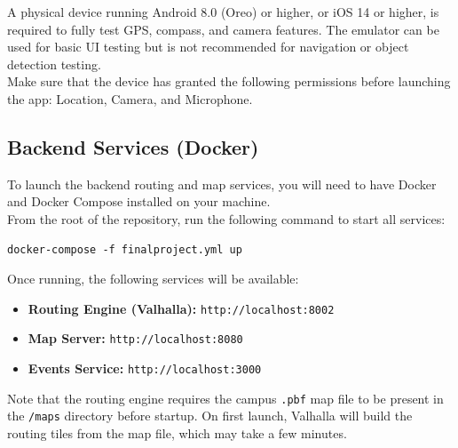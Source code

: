 \documentclass[12pt]{article}
\begin{document}
\noindent A physical device running Android 8.0 (Oreo) or higher, or iOS 14 or higher, is required to fully test GPS, compass, and camera features. The emulator can be used for basic UI testing but is not recommended for navigation or object detection testing. \\

\noindent Make sure that the device has granted the following permissions before launching the app: Location, Camera, and Microphone.

\subsection*{Backend Services (Docker)}

To launch the backend routing and map services, you will need to have Docker and Docker Compose installed on your machine. \\

\noindent From the root of the repository, run the following command to start all services:
\begin{verbatim}
docker-compose -f finalproject.yml up
\end{verbatim}

\noindent Once running, the following services will be available:

\begin{itemize}
    \item \textbf{Routing Engine (Valhalla):} \texttt{http://localhost:8002}
    \item \textbf{Map Server:} \texttt{http://localhost:8080}
    \item \textbf{Events Service:} \texttt{http://localhost:3000}
\end{itemize}

\noindent Note that the routing engine requires the campus \texttt{.pbf} map file to be present in the \texttt{/maps} directory before startup. On first launch, Valhalla will build the routing tiles from the map file, which may take a few minutes.
\end{document}
